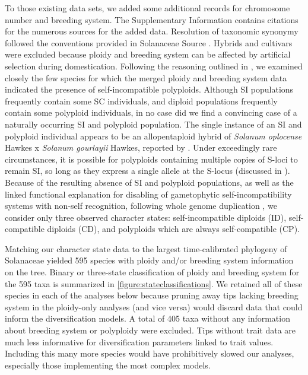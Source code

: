To those existing data sets, we added some additional records for chromosome number and breeding system.
The Supplementary Information contains citations for the numerous sources for the added data. %
Resolution of taxonomic synonymy followed the conventions provided in Solanaceae Source \citep{solsource}. 
Hybrids and cultivars were excluded because ploidy and breeding system can be affected by artificial selection during domestication.
Following the reasoning outlined in \citet{robertson_2011}, we examined closely the few species for which the merged ploidy and breeding system data indicated the presence of self-incompatible polyploids.
Although SI populations frequently contain some SC individuals, and diploid populations frequently contain some polyploid individuals, in no case did we find a convincing case of a naturally occurring SI and polyploid population.
The single instance of an SI and polyploid individual appears to be an allopentaploid hybrid of {\em Solanum oplocense} Hawkes x {\em Solanum gourlayii} Hawkes, reported by \citet{camadro_1981}.
Under exceedingly rare circumstances, it is possible for polyploids containing multiple copies of S-loci to remain SI, so long as they express a single allele at the S-locus (discussed in \citealt{robertson_2011}).
Because of the resulting absence of SI and polyploid populations, as well as the linked functional explanation for disabling of gametophytic self-incompatibility systems with non-self recognition, following whole genome duplication \citep[reviewed in][]{ramsey_1998,stone_2002}, we consider only three observed character states: self-incompatible diploids (ID), self-compatible diploids (CD), and polyploids which are always self-compatible (CP).

Matching our character state data to the largest time-calibrated phylogeny of Solanaceae \citep{sarkinen_2013} yielded 595 species with ploidy and/or breeding system information on the tree.
Binary or three-state classification of ploidy and breeding system for the 595 taxa is summarized in \cref{figure:stateclassifications}.
We retained all of these species in each of the analyses below because pruning away tips lacking breeding system in the ploidy-only analyses (and vice versa) would discard data that could inform the diversification models.
A total of 405 taxa without any information about breeding system or polyploidy were excluded.
Tips without trait data are much less informative for diversification parameters linked to trait values.
Including this many more species would have prohibitively slowed our analyses, especially those implementing the most complex models.

